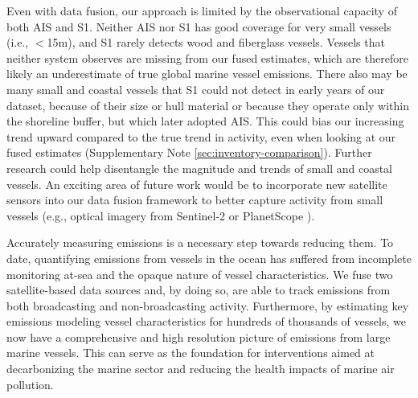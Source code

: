 \documentclass[lineno,pdflatex,sn-nature]{sn-jnl}
\begin{document}
Even with data fusion, our approach is limited by the observational capacity of both AIS and S1. Neither AIS nor S1 has good coverage for very small vessels (i.e., $<$15m), and S1 rarely detects wood and fiberglass vessels. Vessels that neither system observes are missing from our fused estimates, which are therefore likely an underestimate of true global marine vessel emissions. There also may be many small and coastal vessels that S1 could not detect in early years of our dataset, because of their size or hull material or because they operate only within the shoreline buffer, but which later adopted AIS. This could bias our increasing trend upward compared to the true trend in activity, even when looking at our fused estimates (Supplementary Note \ref{sec:inventory-comparison}). Further research could help disentangle the magnitude and trends of small and coastal vessels. An exciting area of future work would be to incorporate new satellite sensors into our data fusion framework to better capture activity from small vessels (e.g., optical imagery from Sentinel-2 or PlanetScope \cite{wei2026satellite}).


Accurately measuring emissions is a necessary step towards reducing them. To date, quantifying emissions from vessels in the ocean has suffered from incomplete monitoring at-sea and the opaque nature of vessel characteristics. We fuse two satellite-based data sources and, by doing so, are able to track emissions from both broadcasting and non-broadcasting activity. Furthermore, by estimating key emissions modeling vessel characteristics for hundreds of thousands of vessels, we now have a comprehensive and high resolution picture of emissions from large marine vessels. This can serve as the foundation for interventions aimed at decarbonizing the marine sector and reducing the health impacts of marine air pollution.
\end{document}
